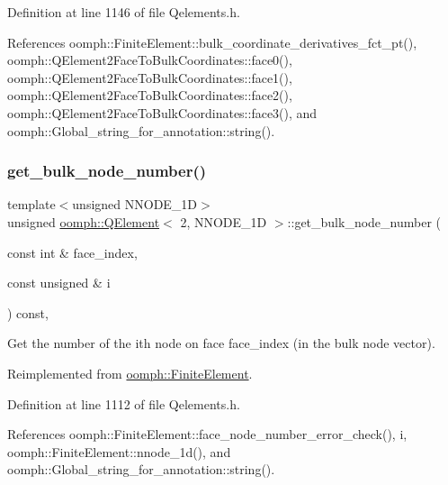 Definition at line 1146 of file Qelements.\+h.



References oomph\+::\+Finite\+Element\+::bulk\+\_\+coordinate\+\_\+derivatives\+\_\+fct\+\_\+pt(), oomph\+::\+Q\+Element2\+Face\+To\+Bulk\+Coordinates\+::face0(), oomph\+::\+Q\+Element2\+Face\+To\+Bulk\+Coordinates\+::face1(), oomph\+::\+Q\+Element2\+Face\+To\+Bulk\+Coordinates\+::face2(), oomph\+::\+Q\+Element2\+Face\+To\+Bulk\+Coordinates\+::face3(), and oomph\+::\+Global\+\_\+string\+\_\+for\+\_\+annotation\+::string().

\mbox{\label{classoomph_1_1QElement_3_012_00_01NNODE__1D_01_4_aed98e224827d6dacf139587ab60c66d1}} 
\subsubsection{\texorpdfstring{get\+\_\+bulk\+\_\+node\+\_\+number()}{get\_bulk\_node\_number()}}
{\footnotesize\ttfamily template$<$unsigned N\+N\+O\+D\+E\+\_\+1D$>$ \\
unsigned \hyperlink{classoomph_1_1QElement}{oomph\+::\+Q\+Element}$<$ 2, N\+N\+O\+D\+E\+\_\+1D $>$\+::get\+\_\+bulk\+\_\+node\+\_\+number (\begin{DoxyParamCaption}\item[{const int \&}]{face\+\_\+index,  }\item[{const unsigned \&}]{i }\end{DoxyParamCaption}) const\hspace{0.3cm}{\ttfamily [inline]}, {\ttfamily [virtual]}}

Get the number of the ith node on face face\+\_\+index (in the bulk node vector). 

Reimplemented from \hyperlink{classoomph_1_1FiniteElement_a2cd0ee849adf50dae1a70a20fab47119}{oomph\+::\+Finite\+Element}.



Definition at line 1112 of file Qelements.\+h.



References oomph\+::\+Finite\+Element\+::face\+\_\+node\+\_\+number\+\_\+error\+\_\+check(), i, oomph\+::\+Finite\+Element\+::nnode\+\_\+1d(), and oomph\+::\+Global\+\_\+string\+\_\+for\+\_\+annotation\+::string().

